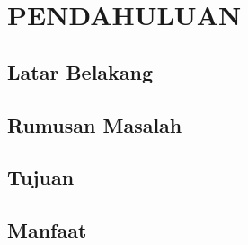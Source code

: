 \section{PENDAHULUAN}

\subsection{Latar Belakang}

\subsection{Rumusan Masalah}

\subsection{Tujuan}

\subsection{Manfaat}

\newpage